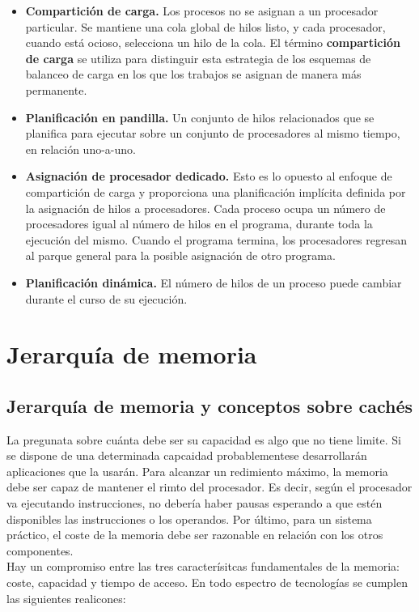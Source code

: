 \documentclass{article}
\begin{document}
					\begin{itemize}
					\item \textbf{Compartición de carga.} Los procesos no se asignan a un procesador particular. Se mantiene una cola global de hilos listo, y cada procesador, cuando está ocioso, selecciona un hilo de la cola. El término \textbf{compartición de carga} se utiliza para distinguir esta estrategia de los esquemas de balanceo de carga en los que los trabajos se asignan de manera más permanente.
					\item  \textbf{Planificación en pandilla.} Un conjunto de hilos relacionados que se planifica para ejecutar sobre un conjunto de procesadores al mismo tiempo, en relación uno-a-uno.
					\item \textbf{Asignación de procesador dedicado.} Esto es lo opuesto al enfoque de compartición de carga y proporciona una planificación implícita definida por la asignación de hilos a procesadores. Cada proceso ocupa un número de procesadores igual al número de hilos en el programa, durante toda la ejecución del mismo. Cuando el programa termina, los procesadores regresan al parque general para la posible asignación de otro programa.
					 \item \textbf{Planificación dinámica.} El número de hilos de un proceso puede cambiar durante el curso de su ejecución.
					\end{itemize}
					
\section{Jerarquía de memoria}
	\subsection{Jerarquía de memoria y conceptos sobre cachés}
		La pregunata sobre cuánta debe ser su capacidad es algo que no tiene limite. Si se dispone de una determinada capcaidad probablementese desarrollarán aplicaciones que la usarán. Para alcanzar un redimiento máximo, la memoria debe ser capaz de mantener el rimto del procesador. Es decir, según el procesador va ejecutando instrucciones, no debería haber pausas esperando a que estén disponibles las instrucciones o los operandos. Por último, para un sistema práctico, el coste de la memoria debe ser razonable en relación con los otros componentes. \\
		
		Hay un compromiso entre las tres caracterísitcas fundamentales de la memoria: coste, capacidad y tiempo de acceso. En todo espectro de tecnologías se cumplen las siguientes realicones:
		
\end{document}
